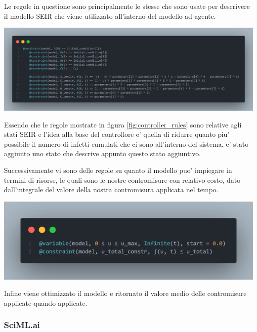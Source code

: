 Le regole in questione sono principalmente le stesse che sono usate per descrivere il modello SEIR
che viene utilizzato all'interno del modello ad agente.

\begin{minipage}{\linewidth}
	\centering
	\includegraphics[width=\textwidth]{img/controller_rules.png}
	\label{fig:controller_rules}
\end{minipage}

Essendo che le regole mostrate in figura \ref{fig:controller_rules} sono relative agli stati 
SEIR e l'idea alla base del controllore e' quella di ridurre quanto piu' possibile il numero di
infetti cumulati che ci sono all'interno del sistema, e' stato aggiunto uno stato che descrive
appunto questo stato aggiuntivo.

Successivamente vi sono delle regole su quanto il modello puo' impiegare in termini di risorse, 
le quali sono le nostre contromisure con relativo costo, dato dall'integrale del valore della nostra
contromisura applicata nel tempo.

\begin{minipage}{\linewidth}
	\centering
	\includegraphics[width=\textwidth]{img/controller_rules_1.png}
	\label{fig:controller_rules_1}
\end{minipage}

Infine viene ottimizzato il modello e ritornato il valore medio delle contromisure applicate
quando applicate. 

\subsubsection{SciML.ai}

